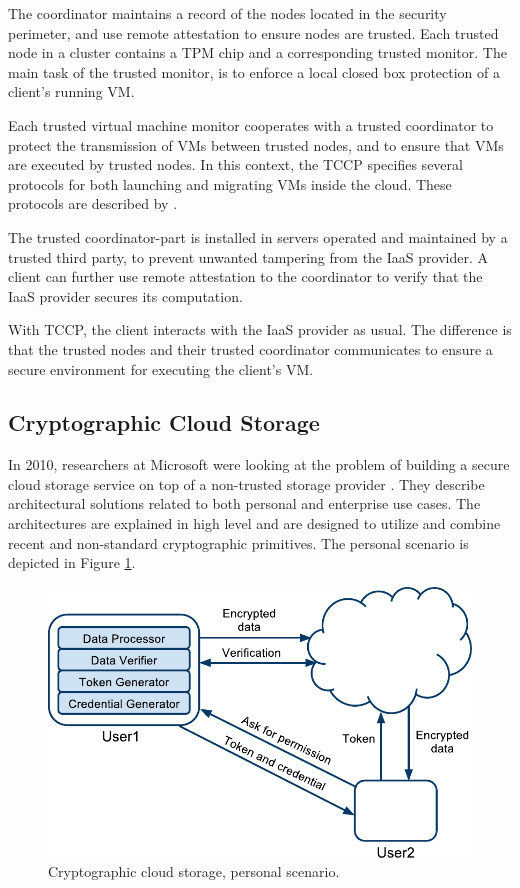 \documentclass[pdftex,english,10pt,b5paper,twoside]{book}
\begin{document}
The coordinator maintains a record of the nodes located in the security
perimeter, and use remote attestation to ensure nodes are trusted. Each trusted
node in a cluster contains a \ac{TPM} chip and a corresponding trusted monitor.
The main task of the trusted monitor, is to enforce a local closed box
protection of a client's running \ac{VM}.

Each trusted virtual machine monitor cooperates with a trusted coordinator to
protect the transmission of \acp{VM} between trusted nodes, and to ensure that
\acp{VM} are executed by trusted nodes. In this context, the \ac{TCCP}
specifies several protocols for both launching and migrating \acp{VM} inside
the cloud. These protocols are described by \citet{tccp}.

The trusted coordinator-part is installed in servers operated and maintained by a
trusted third party, to prevent unwanted tampering from the \ac{IaaS} provider.
A client can further use remote attestation to the coordinator to verify that the
\ac{IaaS} provider secures its computation.

With \ac{TCCP}, the client interacts with the \ac{IaaS} provider as usual. The
difference is that the trusted nodes and their trusted coordinator communicates
to ensure a secure environment for executing the client's \ac{VM}.

\subsection{Cryptographic Cloud Storage}

In 2010, researchers at Microsoft were looking at the problem of building a
secure cloud storage service on top of a non-trusted storage provider
\cite{microsoftresearch}. They describe architectural solutions related to both
personal and enterprise use cases. The architectures are explained in high
level and are designed to utilize and combine recent and non-standard
cryptographic primitives. The personal scenario is depicted in Figure
\ref{fig:RW:CCS:CA}.

\begin{figure}[h!]
    \centering
    \includegraphics[scale=0.6]{ArchitectureCCSC.pdf}
    \caption{Cryptographic cloud storage, personal scenario.}
    \label{fig:RW:CCS:CA}
\end{figure}
\end{document}
